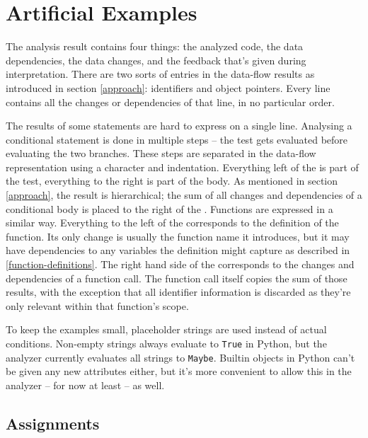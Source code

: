 \documentclass[a4paper, 16pt, oneside]{Thesis}
\begin{document}
\clearpage

\section{Artificial Examples}\label{artificial-examples}

The analysis result contains four things: the analyzed code, the data
dependencies, the data changes, and the feedback that's given during
interpretation. There are two sorts of entries in the data-flow results
as introduced in section \ref{approach}: identifiers and object
pointers. Every line contains all the changes or dependencies of that
line, in no particular order.

The results of some statements are hard to express on a single line.
Analysing a conditional statement is done in multiple steps -- the test
gets evaluated before evaluating the two branches. These steps are
separated in the data-flow representation using a \texttt{\textbar{}}
character and indentation. Everything left of the \texttt{\textbar{}} is
part of the test, everything to the right is part of the body. As
mentioned in section \ref{approach}, the result is hierarchical; the sum
of all changes and dependencies of a conditional body is placed to the
right of the \texttt{\textbar{}}. Functions are expressed in a similar
way. Everything to the left of the \texttt{\textbar{}} corresponds to
the definition of the function. Its only change is usually the function
name it introduces, but it may have dependencies to any variables the
definition might capture as described in \ref{function-definitions}. The
right hand side of the \texttt{\textbar{}} corresponds to the changes
and dependencies of a function call. The function call itself copies the
sum of those results, with the exception that all identifier information
is discarded as they're only relevant within that function's scope.

To keep the examples small, placeholder strings are used instead of
actual conditions. Non-empty strings always evaluate to \texttt{True} in
Python, but the analyzer currently evaluates all strings to
\texttt{Maybe}. Builtin objects in Python can't be given any new
attributes either, but it's more convenient to allow this in the
analyzer -- for now at least -- as well.

\clearpage

\subsection{Assignments}\label{assignments}
\end{document}
